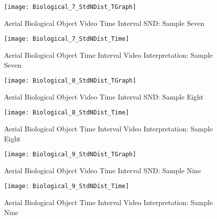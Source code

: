 \newpage  %


\begin{figure}[H]
	\center 
	\texttt{[image: Biological\_7\_StdNDist\_TGraph]}
	\captionsetup{list=no}	
	\caption[Aerial Biological Object Video Time Interval SND: Sample Seven]{Aerial Biological Object Video Time Interval SND: Sample Seven}
\end{figure}

\begin{figure}[H]
	\center 
	\texttt{[image: Biological\_7\_StdNDist\_Time]}
	\captionsetup{list=no}
	\caption[Aerial Biological Object Time Interval Video Interpretation: Sample Seven]{Aerial Biological Object Time Interval Video Interpretation: Sample Seven}
\end{figure}

\newpage  %


\begin{figure}[H]
	\center 
	\texttt{[image: Biological\_8\_StdNDist\_TGraph]}
	\captionsetup{list=no}	
	\caption[Aerial Biological Object Video Time Interval SND: Sample Eight]{Aerial Biological Object Video Time Interval SND: Sample Eight}
\end{figure}

\begin{figure}[H]
	\center 
	\texttt{[image: Biological\_8\_StdNDist\_Time]}
	\captionsetup{list=no}
	\caption[Aerial Biological Object Time Interval Video Interpretation: Sample Eight]{Aerial Biological Object Time Interval Video Interpretation: Sample Eight}
\end{figure}

\newpage  %


\begin{figure}[H]
	\center 
	\texttt{[image: Biological\_9\_StdNDist\_TGraph]}
	\captionsetup{list=no}
	\caption[Aerial Biological Object Video Time Interval SND: Sample Nine]{Aerial Biological Object Video Time Interval SND: Sample Nine}
\end{figure}

\begin{figure}[H]
	\center 
	\texttt{[image: Biological\_9\_StdNDist\_Time]}
	\captionsetup{list=no}	
	\caption[Aerial Biological Object Time Interval Video Interpretation: Sample Nine]{Aerial Biological Object Time Interval Video Interpretation: Sample Nine}
\end{figure}

